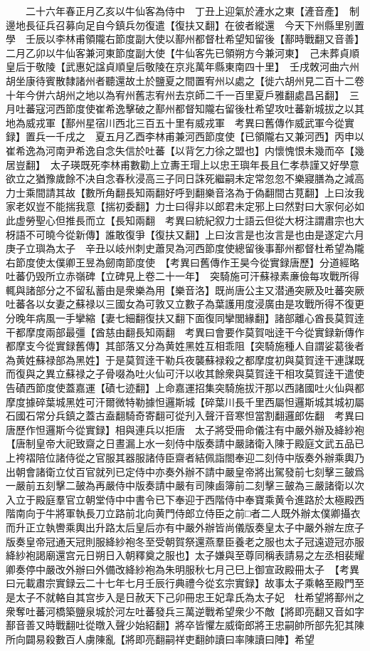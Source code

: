 　　二十六年春正月乙亥以牛仙客為侍中　丁丑上迎氣於滻水之東【滻音產】　制邊地長征兵召募向足自今鎮兵勿復遣【復扶又翻】在彼者縱還　今天下州縣里别置學　壬辰以李林甫領隴右節度副大使以鄯州都督杜希望知留後【鄯時戰翻又音善】二月乙卯以牛仙客兼河東節度副大使【牛仙客先已領朔方今兼河東】　己未葬貞順皇后于敬陵【武惠妃諡貞順皇后敬陵在京兆萬年縣東南四十里】　壬戌敇河曲六州胡坐康待賓散隸諸州者聽還故土於鹽夏之間置宥州以處之【徙六胡州見二百十二卷十年今併六胡州之地以為宥州舊志宥州去京師二千一百里夏戶雅翻處昌呂翻】　三月吐蕃寇河西節度使崔希逸擊破之鄯州都督知隴右留後杜希望攻吐蕃新城拔之以其地為威戎軍【鄯州星宿川西北三百五十里有威戎軍　考異曰舊傳作威武軍今從實録】置兵一千戌之　夏五月乙酉李林甫兼河西節度使【已領隴右又兼河西】丙申以崔希逸為河南尹希逸自念失信於吐蕃【以背乞力徐之盟也】内懷愧恨未幾而卒【幾居豈翻】　太子瑛既死李林甫數勸上立夀王瑁上以忠王璵年長且仁孝恭謹又好學意欲立之猶豫歲餘不决自念春秋浸高三子同日誅死繼嗣未定常忽忽不樂寢膳為之減高力士乘間請其故【數所角翻長知兩翻好呼到翻樂音洛為于偽翻間古莧翻】上曰汝我家老奴豈不能揣我意【揣初委翻】力士曰得非以郎君未定邪上曰然對曰大家何必如此虚勞聖心但推長而立【長知兩翻　考異曰統紀叙力士語云但從大枒注謂肅宗也大枒語不可曉今從新傳】誰敢復爭【復扶又翻】上曰汝言是也汝言是也由是遂定六月庚子立璵為太子　辛丑以岐州刺史蕭炅為河西節度使總留後事鄯州都督杜希望為隴右節度使太僕卿王昱為劒南節度使　【考異曰舊傳作王昊今從實録唐歷】分道經略吐蕃仍毁所立赤嶺碑【立碑見上卷二十一年】　突騎施可汗蘇禄素亷儉每攻戰所得輒與諸部分之不留私蓄由是衆樂為用【樂音洛】既尚唐公主又潜通突厥及吐蕃突厥吐蕃各以女妻之蘇禄以三國女為可敦又立數子為葉護用度浸廣由是攻戰所得不復更分晚年病風一手攣縮【妻七細翻復扶又翻下面復同攣閭緣翻】諸部離心酋長莫賀逹干都摩度兩部最彊【酋慈由翻長知兩翻　考異曰會要作莫賀咄逹干今從實録新傳作都摩支今從實録舊傳】其部落又分為黄姓黑姓互相乖阻【突騎施種人自謂娑葛後者為黄姓蘇禄部為黑姓】于是莫賀逹干勒兵夜襲蘇禄殺之都摩度初與莫賀逹干連謀既而復與之異立蘇禄之子骨啜為吐火仙可汗以收其餘衆與莫賀逹干相攻莫賀逹干遣使告磧西節度使蓋嘉運【磧七迹翻】上命嘉運招集突騎施拔汗那以西諸國吐火仙與都摩度據碎葉城黑姓可汗爾微特勒據怛邏斯城【碎葉川長千里西屬怛邏斯城其城初屬石國石常分兵鎮之蓋古盍翻騎奇寄翻可從刋入聲汗音寒怛當割翻邏郎佐翻　考異曰唐歷作怛邏斯今從實録】相與連兵以拒唐　太子將受冊命儀注有中嚴外辦及絳紗袍【唐制皇帝大祀致齋之日晝漏上水一刻侍中版奏請中嚴諸衛入陳于殿庭文武五品已上袴褶陪位諸侍從之官服其器服諸侍臣齋者結佩詣閤奉迎二刻侍中版奏外辦乘輿乃出朝會諸衛立仗百官就列已定侍中亦奏外辦不請中嚴皇帝將出駕發前七刻擊三皷爲一嚴前五刻擊二皷為再嚴侍中版奏請中嚴有司陳鹵簿前二刻擊三皷為三嚴諸衛以次入立于殿庭羣官立朝堂侍中中書令已下奉迎于西階侍中奉寶乘黄令進路於太極殿西階南向于牛將軍執長刀立路前北向黄門侍郎立侍臣之前□者二人既外辦太僕卿攝衣而升正立執轡乘輿出升路太后皇后亦有中嚴外辦皆尚儀版奏皇太子中嚴外辦左庶子版奏皇帝冠通天冠則服絳紗袍冬至受朝賀祭還燕羣臣養老之服也太子冠遠遊冠亦服絳紗袍謁廟還宫元日朔日入朝釋奠之服也】太子嫌與至尊同稱表請易之左丞相裴耀卿奏停中嚴改外辦曰外備改絳紗袍為朱明服秋七月己巳上御宣政殿冊太子　【考異曰元載肅宗實録云二十七年七月壬辰行典禮今從玄宗實録】故事太子乘輅至殿門至是太子不就輅自其宫步入是日赦天下己卯冊忠王妃韋氏為太子妃　杜希望將鄯州之衆奪吐蕃河橋築鹽泉城於河左吐蕃發兵三萬逆戰希望衆少不敵【將即亮翻又音如字鄯音善又時戰翻吐從暾入聲少始紹翻】將卒皆懼左威衛郎將王忠嗣帥所部先犯其陳所向闢易殺數百人虜陳亂【將即亮翻嗣祥吏翻帥讀曰率陳讀曰陣】希望